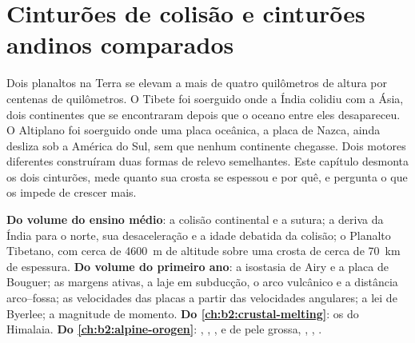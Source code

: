 \chapter{Cinturões de colisão e cinturões andinos comparados}\label{ch:b2:himalaya-andes}

Dois planaltos na Terra se elevam a mais de quatro quilômetros de altura por centenas de quilômetros.
O Tibete foi soerguido onde a Índia colidiu com a Ásia, dois continentes que se encontraram depois que o oceano entre
eles desapareceu. O Altiplano foi soerguido onde uma placa oceânica, a placa de Nazca, ainda desliza
sob a América do Sul, sem que nenhum continente chegasse. Dois motores diferentes construíram duas
formas de relevo semelhantes. Este capítulo desmonta os dois cinturões, mede quanto sua crosta
se espessou e por quê, e pergunta o que os impede de crescer mais.

\begin{recall}
\textbf{Do volume do ensino médio}: a colisão continental e a sutura; a deriva da Índia
para o norte, sua desaceleração e a idade debatida da colisão; o Planalto Tibetano, com cerca de
\qty{4600}{m} de altitude sobre uma crosta de cerca de \qty{70}{km} de espessura. \textbf{Do volume do primeiro ano}:
a isostasia de Airy e a placa de Bouguer; as margens ativas, a laje em subducção, o arco vulcânico e
a distância arco--fossa; as velocidades das placas a partir das velocidades angulares; a lei de Byerlee; a magnitude
de momento. \textbf{Do \cref{ch:b2:crustal-melting}}: os  do Himalaia.
\textbf{Do \cref{ch:b2:alpine-orogen}}: , , ,  e de
pele grossa, , , .
\end{recall}

